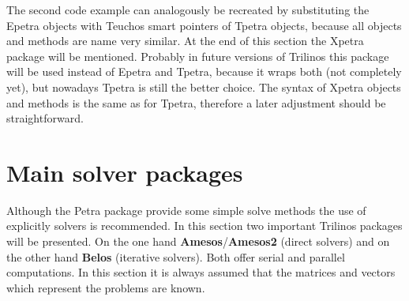 \documentclass[10pt,a4paper,final,titlepage]{article}
\begin{document}
The second code example can analogously be recreated by substituting the Epetra objects with Teuchos smart pointers of Tpetra objects, because all objects and methods are name very similar.
\newline \newline
At the end of this section the Xpetra package will be mentioned. Probably in future versions of Trilinos this package will be used instead of Epetra and Tpetra, because it wraps both (not completely yet), but nowadays Tpetra is still the better choice. The syntax of Xpetra objects and methods is the same as for Tpetra, therefore a later adjustment should be straightforward. 


\section{Main solver packages}
Although the Petra package provide some simple solve methods the use of explicitly solvers is recommended. In this section two important Trilinos packages will be presented. On the one hand \textbf{Amesos}/\textbf{Amesos2} (direct solvers) and on the other hand \textbf{Belos} (iterative solvers). Both offer serial and parallel computations.
\newline \newline
In this section it is always assumed that the matrices and vectors which represent the problems are known.
\end{document}
